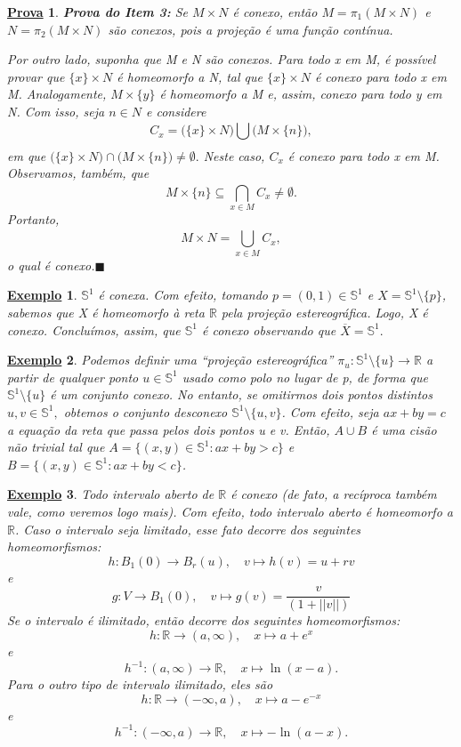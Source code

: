 \documentclass{article}
\newtheorem{example}{\underline{Exemplo}}
\newtheorem*{proof*}{\underline{Prova}}
\renewcommand\qedsymbol{$\blacksquare$}
\begin{document}
\begin{proof*}
  \textbf{Prova do Item 3:} Se \(M\times N\) é conexo, então \(M = \pi_{1}(M\times N)\) e \(N = \pi_{2}(M\times N)\) são conexos, pois
a projeção é uma função contínua. 

  Por outro lado, suponha que M e N são conexos. Para todo x em M, é possível provar
que \(\{x\}\times N\) é homeomorfo a N, tal que \(\{x\}\times N\) é conexo para todo x em M. Analogamente, \(M\times\{y\}\) é 
homeomorfo a M e, assim, conexo para todo y em N. Com isso, seja \(n\in N\) e considere 
  \[
    C_{x} = \biggl(\{x\}\times N\biggr)\bigcup_{}^{}{\biggl(M\times \{n\}\biggr)},
  \]
em que \(\biggl(\{x\}\times N\biggr)\cap \biggl(M\times \{n\}\biggr)\neq\emptyset.\) Neste caso, \(C_{x}\) é conexo para todo
x em M. Observamos, também, que 
  \[
    M\times \{n\}\subseteq{\bigcap_{x\in M}^{}{C_{x}}}\neq\emptyset.
  \]
  Portanto, 
    \[
      M\times N = \bigcup_{x\in M}^{}{C_{x}},
    \]
o qual é conexo.\qedsymbol
\end{proof*}
\begin{example}
  \(\mathbb{S}^{1}\) é conexa. Com efeito, tomando \(p = (0, 1)\in \mathbb{S}^{1}\) e \(X = \mathbb{S}^{1}\setminus\{p\}\), sabemos que X é homeomorfo
à reta \(\mathbb{R}\) pela projeção estereográfica. Logo, X é conexo. Concluímos, assim, que \(\mathbb{S}^{1}\) é conexo observando que
 \(\overline{X} = \mathbb{S}^{1}.\)
\end{example}
\begin{example}
  Podemos definir uma ``projeção estereográfica'' \(\pi_{u}:\mathbb{S}^{1}\setminus\{u\}\rightarrow \mathbb{R}\) a partir de qualquer ponto 
 \(u\in \mathbb{S}^{1}\) usado como polo no lugar de p, de forma que \(\mathbb{S}^{1}\setminus\{u\}\) é um conjunto conexo. No entanto, se omitirmos dois pontos distintos \(u, v\in \mathbb{S}^{1},\) obtemos o conjunto
 desconexo \(\mathbb{S}^{1}\setminus\{u, v\}\). Com efeito, seja \(ax + by = c\) a equação da reta que passa
 pelos dois pontos u e v. Então, \(A\cup B\) é uma cisão não trivial tal que \(A = \{(x, y)\in \mathbb{S}^{1}: ax + by > c\}\) e 
 \(B = \{(x, y)\in \mathbb{S}^{1}: ax + by < c\}\).
\end{example}
\begin{example}
  Todo intervalo aberto de \(\mathbb{R}\) é conexo (de fato, a recíproca também vale, como veremos logo mais). Com efeito, todo intervalo
aberto é homeomorfo a \(\mathbb{R}\). Caso o intervalo seja limitado, esse fato decorre dos seguintes homeomorfismos:
  \[
    h:B_{1}(0)\rightarrow B_{r}(u),\quad v\mapsto h(v) = u + rv
  \]
e 
  \[
    g:V\rightarrow B_{1}(0),\quad v\mapsto g(v) = \frac{v}{(1+||v||)}
  \]
Se o intervalo é ilimitado, então decorre dos seguintes homeomorfismos:
  \[
    h:\mathbb{R}\rightarrow (a, \infty),\quad x\mapsto a + e^{x}
  \]
e 
  \[
    h^{-1}:(a, \infty)\rightarrow \mathbb{R},\quad x\mapsto \ln{(x-a)}.
  \]
Para o outro tipo de intervalo ilimitado, eles são 
  \[
    h:\mathbb{R}\rightarrow (-\infty, a),\quad x\mapsto a - e^{-x}
  \]
e 
  \[
    h^{-1}:(-\infty, a)\rightarrow \mathbb{R},\quad x\mapsto -\ln{(a-x)}.
  \]
\end{example}
\end{document}

